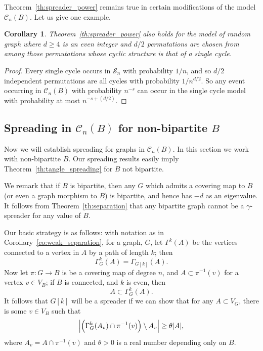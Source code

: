 \documentclass{memo-l}
\theoremstyle{plain}
\newtheorem{corollary}[theorem]{Corollary}
\theoremstyle{definition}
\numberwithin{section}{chapter}
\numberwithin{equation}{chapter}
\newcommand{\from}{\colon}
\theoremstyle{plain}
\theoremstyle{definition}
\newcommand\cC{\mathcal{C}}
\newcommand\cS{\mathcal{S}}
\begin{document}
Theorem~\ref{th:spreader_power} remains true in certain modifications
of the model $\cC_n(B)$.
Let us give one example.

\begin{corollary}
\label{co:spreader_power_cycle}
Theorem~\ref{th:spreader_power} also holds for the model of random graph
where $d\ge 4$ is an even integer and
$d/2$ permutations are chosen from among those permutations whose
cyclic structure is that of a single cycle.
\end{corollary}
\begin{proof}
Every single cycle occurs in $\cS_n$ with probability $1/n$, and so
$d/2$ independent permutations are all cycles with probability $1/n^{d/2}$.
So any event occurring in $\cC_n(B)$ with probability $n^{-s}$ can
occur in the single cycle model with probability at most $n^{-s+(d/2)}$.
\end{proof}



\subsection{Spreading in $\cC_n(B)$ for non-bipartite $B$}

Now we will establish spreading for graphs in $\cC_n(B)$.
In this section we work with non-bipartite $B$.
Our spreading results easily imply
Theorem~\ref{th:tangle_spreading} for $B$ not
bipartite.

We remark that if $B$ is bipartite, then any
$G$ which admits a covering map to $B$ (or even a graph morphism to $B$)
is bipartite, and hence has $-d$ as an eigenvalue.
It follows from Theorem~\ref{th:separation}
that any bipartite graph cannot be a $\gamma$-spreader for any value of
$B$.

Our basic strategy is as follows: with notation as in
Corollary~\ref{co:weak_separation}, for a graph, $G$, let
$\Gamma^k(A)$ be the vertices connected to a vertex in $A$ by
a path of length $k$; then
$$
\Gamma^k_G(A) = \Gamma_{G[k]}(A).
$$
Now let 
$\pi\from G\to B$ is be a
covering map of degree $n$, and $A\subset \pi^{-1}(v)$ for a vertex
$v\in V_B$; if $B$ is connected, and $k$ is even, then
$$
A\subset \Gamma^k_G(A).
$$
It follows that $G[k]$ will be a spreader if we can show that for
any $A\subset V_G$, there is some $v\in V_B$ such that
\begin{equation}\label{eq:fibre_spread}
\Bigl| \Bigl( \Gamma^k_G(A_v)\cap\pi^{-1}(v)\Bigr)\setminus A_v \Bigr|
\ge \theta |A|,
\end{equation}
where $A_v=A\cap\pi^{-1}(v)$ and $\theta>0$ is a real number depending
only on $B$.
\end{document}
